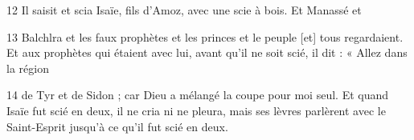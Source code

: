 \par 12 Il saisit et scia Isaïe, fils d'Amoz, avec une scie à bois. Et Manassé et

\par 13 Balchlra et les faux prophètes et les princes et le peuple [et] tous regardaient. Et aux prophètes qui étaient avec lui, avant qu'il ne soit scié, il dit : « Allez dans la région

\par 14 de Tyr et de Sidon ; car Dieu a mélangé la coupe pour moi seul. Et quand Isaïe fut scié en deux, il ne cria ni ne pleura, mais ses lèvres parlèrent avec le Saint-Esprit jusqu'à ce qu'il fut scié en deux.

